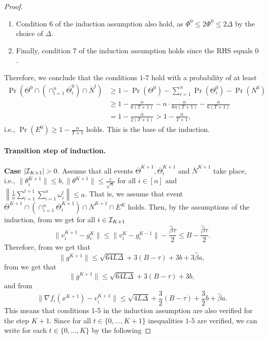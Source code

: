 \documentclass[a4paper,11pt]{article}
\begin{document}
\begin{proof}
\begin{enumerate}
        \item Condition $6$ of the induction assumption also hold, as $\Phi^0 \le 2\Phi^0 \le 2\Delta$ by the choice of $\Delta$.

        \item Finally, condition $7$ of the induction assumption holds since the RHS equals $0$.

    \end{enumerate}
    Therefore, we conclude that the conditions $1$-$7$ hold with a probability of at least 
    \begin{align*}
        \Pr\left(\Theta^0\cap \left(\cap_{i=1}^n\overline{\Theta}_i^0\right)\cap \overline{N}^t\right) &\ge 1 - \Pr(\Theta^0) - \sum_{i=1}^n \Pr(\Theta_i^0) - \Pr(N^0)\\
        &\ge 
        1 
        - \frac{\alpha}{6(T+1)}
        - n\cdot \frac{\alpha}{6n(T+1)} 
        - \frac{\alpha}{6(T+1)}\\
        &= 1-\frac{\alpha}{2(T+1)} > 1- \frac{\alpha}{T+1},
    \end{align*}
    i.e., $\Pr(E^0) \ge 1-\frac{\alpha}{T+1}$ holds. This is the base of the induction.


    \paragraph{Transition step of induction.}

    {\bf Case $|\mathcal{I}_{K+1}| > 0.$}  Assume that all events $\overline{\Theta}^{K+1}, \overline{\Theta}^{K+1}_i$ and $\overline{N}^{K+1}$ take place, i.e., $\|\theta^{K+1}_i\| \le b, \|\theta^{K+1}\|\le \frac{c}{\sqrt{n}}$ for all $i\in[n]$ and $\left\|\frac{1}{n}\sum_{l=1}^{t+1}\sum_{i=1}^n\omega_i^l\right\|\le a$. That is, we assume that event $\overline{\Theta}^{K+1} \cap \left(\cap_{i=1}^n \overline{\Theta}^{K+1}_i\right) \cap \overline{N}^{K+1} \cap E^K$ holds. Then, by the assumptions of the induction, from  we get for all $i\in \mathcal{I}_{K+1}$
    \[
    \|v_i^{K+1} - g_i^{K}\| \le \|v_i^{K} - g_i^{K-1}\| - \frac{\hat{\beta}\tau}{2} \le B - \frac{\hat{\beta}\tau}{2}.
    \]
    Therefore, from  we get that 
    \[
    \|g^{K+1}\| \le \sqrt{64L\Delta} + 3(B-\tau) + 3b + 3\hat{\beta}a,
    \]
    from  we get that
    \[
    \|\overline{g}^{K+1}\| \le \sqrt{64L\Delta} + 3(B-\tau) + 3b,
    \]
    and from 
    \[
    \|\nabla f_i(x^{K+1}) - v_i^{K+1}\| \le \sqrt{4L\Delta} + \frac{3}{2}(B-\tau) + \frac{3}{2}b + \hat{\beta}a.
    \]
    This means that conditions 1-5 in the induction assumption are also verified for the step $K+1$. Since for all $t\in\{0, \dots, K+1\}$ inequalities $1$-$5$ are verified, we can write for each $t\in \{0,\ldots,K\}$ by  the following 


\end{proof}
\end{document}

